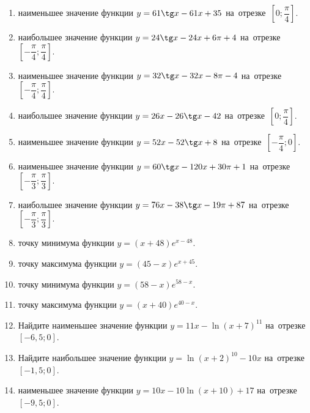 \documentclass[a4paper,10pt]{article}
\begin{document}
\begin{enumerate}
\item {} наименьшее значение функции $y = 61\tg x-61x+35$ на~отрезке~$\left[0;\dfrac{\pi }{4}\right]$.

\item {} наибольшее значение функции $y=24\tg x-24x+6\pi +4$ на~отрезке~$\left[-\dfrac{\pi }{4};\dfrac{\pi }{4}\right]$.

\item {} наименьшее значение функции $y=32\tg x-32x-8\pi -4$ на~отрезке~$\left[-\dfrac{\pi }{4};\dfrac{\pi }{4}\right]$.

\item {} наибольшее значение функции $y = 26x-26\tg x -42$ на~отрезке~$\left[0;\dfrac{\pi }{4}\right]$.

\item {} наименьшее значение функции $y = 52x-52\tg x +8$ на~отрезке~$\left[-\dfrac{\pi }{4};0\right]$.

\item {} наименьшее значение функции $y = 60\tg x-120x+30 \pi +1$ на~отрезке~$\left[-\dfrac{\pi }{3};\dfrac{\pi }{3}\right]$.

\item {} наибольшее значение функции $y = 76x-38\tg x-19\pi +87$ на~отрезке~$\left[-\dfrac{\pi }{3};\dfrac{\pi }{3}\right]$.

\item {} точку минимума функции $y = \left(x+48\right)e^{x-48}$.

\item {} точку максимума функции $y = \left(45-x\right)e^{x+45}$.

\item {} точку минимума функции $y = \left(58-x\right)e^{58-x}$.

\item {} точку максимума функции $y = \left(x+40\right)e^{40-x}$.

\item Найдите наименьшее значение функции $y = 11x-\ln \left(x+7\right)^{11}$ на~отрезке~$\left[-6,5;0\right]$.

\item Найдите наибольшее значение функции $y = \ln \left(x+2\right)^{10}-10x$ на~отрезке~$\left[-1,5;0\right]$.

\item {} наименьшее значение функции $y = 10x-10\ln \left(x+10\right) +17$ на~отрезке~$\left[-9,5;0\right]$.


\end{enumerate}
\end{document}
